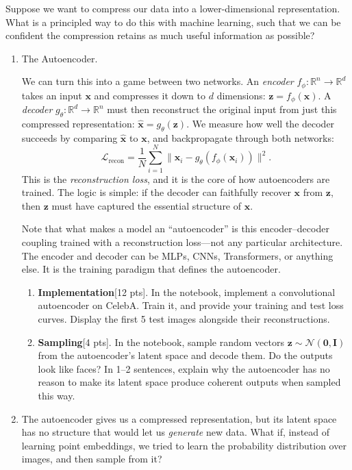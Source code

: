 \documentclass[submit]{../harvardml}
\begin{document}
\begin{problem}
Suppose we want to compress our data into a lower-dimensional representation. What is a principled way to do this with machine learning, such that we can be confident the compression retains as much useful information as possible?

\begin{enumerate}
        \item The Autoencoder. 
        
We can turn this into a game between two networks. An \textit{encoder} $f_\phi : \mathbb R^n \to \mathbb R^d$ takes an input $\mathbf x$ and compresses it down to $d$ dimensions: $\mathbf z = f_\phi(\mathbf x)$. A \textit{decoder} $g_\theta : \mathbb R^d \to \mathbb R^n$ must then reconstruct the original input from just this compressed representation: $\hat{\mathbf x} = g_\theta(\mathbf z)$. We measure how well the decoder succeeds by comparing $\hat{\mathbf x}$ to $\mathbf x$, and backpropagate through both networks:
\[
  \mathcal{L}_{\mathrm{recon}} = \frac{1}{N}\sum_{i=1}^{N} \|\mathbf x_i - g_\theta(f_\phi(\mathbf x_i))\|^2.
\]
This is the \textit{reconstruction loss}, and it is the core of how autoencoders are trained. The logic is simple: if the decoder can faithfully recover $\mathbf x$ from $\mathbf z$, then $\mathbf z$ must have captured the essential structure of $\mathbf x$.

Note that what makes a model an ``autoencoder'' is this encoder--decoder coupling trained with a reconstruction loss---not any particular architecture. The encoder and decoder can be MLPs, CNNs, Transformers, or anything else. It is the training paradigm that defines the autoencoder.

\begin{enumerate}

\item \textbf{Implementation}[12 pts]. In the notebook, implement a convolutional autoencoder on CelebA. Train it, and provide your training and test loss curves. Display the first 5 test images alongside their reconstructions.

\item \textbf{Sampling}[4 pts]. In the notebook, sample random vectors $\mathbf z \sim \mathcal{N}(\bm{0}, \mathbf{I})$ from the autoencoder's latent space and decode them. Do the outputs look like faces? In 1--2 sentences, explain why the autoencoder has no reason to make its latent space produce coherent outputs when sampled this way.
\end{enumerate}
\item The autoencoder gives us a compressed representation, but its latent space has no structure that would let us \textit{generate} new data. What if, instead of learning point embeddings, we tried to learn the probability distribution over images, and then sample from it?


\end{enumerate}
\end{problem}
\end{document}
